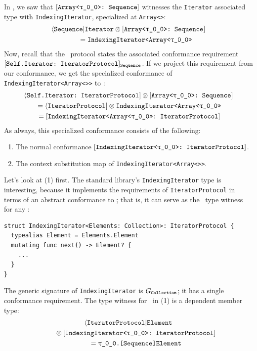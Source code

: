 \documentclass[../generics]{subfiles}
\begin{document}
\begin{example}\label{indexing iterator example}
In , we saw that $\ArraySequence$ witnesses the \texttt{Iterator} associated type with \texttt{IndexingIterator}, specialized at \texttt{Array<\rT>}:
\begin{gather*}
\AIterator \otimes \ArraySequence\\
\qquad {} = \texttt{IndexingIterator<Array<\rT>>}
\end{gather*}
Now, recall that the \tSequence\ protocol states the associated conformance requirement $[\texttt{Self.Iterator:~IteratorProtocol}]_{\texttt{Sequence}}$. If we project this requirement from our conformance, we get the specialized conformance of \texttt{IndexingIterator<Array<\rT>>} to \tIterator:
\begin{gather*}
\SelfIterator \otimes \ArraySequence\\
{} = \PIterator \otimes \texttt{IndexingIterator<Array<\rT>>}\\
{} = \ConfReq{IndexingIterator<Array<\rT>>}{IteratorProtocol}
\end{gather*}
As always, this specialized conformance consists of the following:
\begin{enumerate}
\item The normal conformance $\ConfReq{IndexingIterator<\rT>}{IteratorProtocol}$.
\item The context substitution map of \texttt{IndexingIterator<Array<\rT>>}.
\end{enumerate}
Let's look at (1) first. The standard library's \texttt{IndexingIterator} type is interesting, because it implements the requirements of \texttt{IteratorProtocol} in terms of an abstract conformance to \tCollection; that is, it can serve as the \nIterator\ type witness for any \tCollection:
\begin{Verbatim}
struct IndexingIterator<Elements: Collection>: IteratorProtocol {
  typealias Element = Elements.Element
  mutating func next() -> Element? {
    ...
  }
}
\end{Verbatim}
The generic signature of \texttt{IndexingIterator} is $G_{\texttt{Collection}}$; it has a single conformance requirement. The type witness for \nElement\ in (1) is a dependent member type:
\begin{gather*}
\AIElement \\
\qquad {} \otimes \ConfReq{IndexingIterator<\rT>}{IteratorProtocol} \\
\qquad {} = \texttt{\rT.[Sequence]Element}

\end{gather*}
\end{example}
\end{document}
